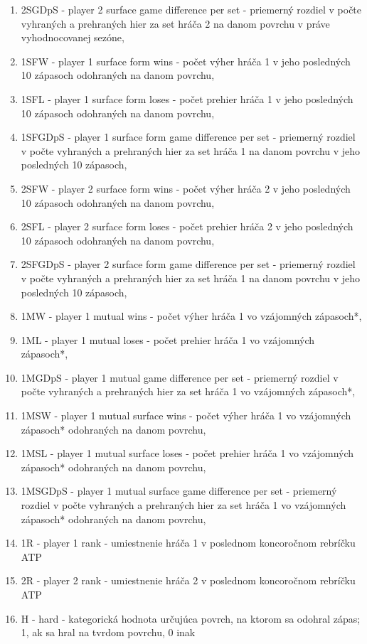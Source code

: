 \begin{enumerate}
 \item 2SGDpS - player 2 surface game difference per set - priemerný rozdiel v počte vyhraných a prehraných hier za set hráča 2 na danom povrchu v práve vyhodnocovanej sezóne,
 \item 1SFW - player 1 surface form wins - počet výher hráča 1 v jeho posledných 10 zápasoch odohraných na danom povrchu,
 \item 1SFL - player 1 surface form loses - počet prehier hráča 1 v jeho posledných 10 zápasoch odohraných na danom povrchu,
 \item 1SFGDpS - player 1 surface form game difference per set - priemerný rozdiel v počte vyhraných a prehraných hier za set hráča 1 na danom povrchu v jeho posledných 10 zápasoch,
 \item 2SFW - player 2 surface form wins - počet výher hráča 2 v jeho posledných 10 zápasoch odohraných na danom povrchu,
 \item 2SFL - player 2 surface form loses - počet prehier hráča 2 v jeho posledných 10 zápasoch odohraných na danom povrchu,
 \item 2SFGDpS - player 2 surface form game difference per set - priemerný rozdiel v počte vyhraných a prehraných hier za set hráča 1 na danom povrchu v jeho posledných 10 zápasoch,
 \item 1MW - player 1 mutual wins - počet výher hráča 1 vo vzájomných zápasoch*,
 \item 1ML - player 1 mutual loses - počet prehier hráča 1 vo vzájomných zápasoch*,
 \item 1MGDpS - player 1 mutual game difference per set - priemerný rozdiel v počte vyhraných a prehraných hier za set hráča 1 vo vzájomných zápasoch*,
 \item 1MSW - player 1 mutual surface wins - počet výher hráča 1 vo vzájomných zápasoch* odohraných na danom povrchu, 
 \item 1MSL - player 1 mutual surface loses - počet prehier hráča 1 vo vzájomných zápasoch* odohraných na danom povrchu,
 \item 1MSGDpS - player 1 mutual surface game difference per set - priemerný rozdiel v počte vyhraných a prehraných hier za set hráča 1 vo vzájomných zápasoch* odohraných na danom povrchu,
 \item 1R - player 1 rank - umiestnenie hráča 1 v poslednom koncoročnom rebríčku ATP
 \item 2R - player 2 rank - umiestnenie hráča 2 v poslednom koncoročnom rebríčku ATP
 \item H - hard - kategorická hodnota určujúca povrch, na ktorom sa odohral zápas; 1, ak sa hral na tvrdom povrchu, 0 inak

\end{enumerate}
